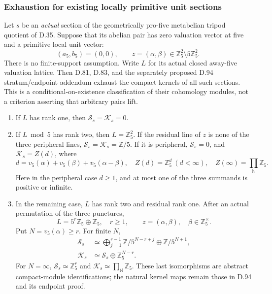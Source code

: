 \subsubsection{Exhaustion for existing locally primitive unit sections}

Let \(s\) be an \emph{actual} section of the geometrically
pro-five metabelian tripod quotient of D.35. Suppose that its
abelian pair has zero valuation vector at five and a primitive
local unit vector:
\[
 (a_5,b_5)=(0,0),\qquad
 z=(\alpha,\beta)\in\mathbb Z_5^2\setminus5\mathbb Z_5^2.
                                                        \tag{LP.1}
\]
There is no finite-support assumption. Write \(L\) for its
actual closed away-five valuation lattice. Then D.81, D.83,
and the separately proposed D.94 stratum/endpoint addendum
exhaust the compact kernels of all such sections. This is a
conditional-on-existence classification of their cohomology
modules, not a criterion asserting that arbitrary pairs lift.

\begin{enumerate}
\item If \(L\) has rank one, then
\(\mathcal S_s=\mathcal K_s=0\).
\item If \(L\bmod5\) has rank two, then \(L=\mathbb Z_5^2\).
If the residual line of \(z\) is none of the three peripheral
lines, \(\mathcal S_s=\mathcal K_s=\mathbb Z/5\).
If it is peripheral, \(\mathcal S_s=0\), and
\(\mathcal K_s=Z(d)\), where
\[
 d=v_5(\alpha)+v_5(\beta)+v_5(\alpha-\beta),
 \quad Z(d)=\mathbb Z_5^d\ (d<\infty),\quad
 Z(\infty)=\prod_{\mathbb N}\mathbb Z_5.
                                                        \tag{LP.2}
\]
Here in the peripheral case \(d\ge1\), and at most one of
the three summands is positive or infinite.
\item In the remaining case, \(L\) has rank two and residual
rank one. After an actual permutation of the three punctures,
\[
 L=5^r\mathbb Z_5\oplus\mathbb Z_5,\quad r\ge1,
 \qquad z=(\alpha,\beta),\quad\beta\in\mathbb Z_5^\times.
                                                        \tag{LP.3}
\]
Put \(N=v_5(\alpha)\ge r\). For finite \(N\),
\[
 \begin{aligned}
 \mathcal S_s&\simeq
       \bigoplus_{j=1}^{r-1}\mathbb Z/5^{N-r+j}
                  \oplus\mathbb Z/5^{N+1},\\
 \mathcal K_s&\simeq\mathcal S_s\oplus\mathbb Z_5^{N-r}.
 \end{aligned}                                         \tag{LP.4}
\]
For \(N=\infty\),
\(\mathcal S_s\simeq\mathbb Z_5^r\) and
\(\mathcal K_s\simeq\prod_{\mathbb N}\mathbb Z_5\).
These last isomorphisms are abstract compact-module
identifications; the natural kernel maps remain those in
D.94 and its endpoint proof.
\end{enumerate}

